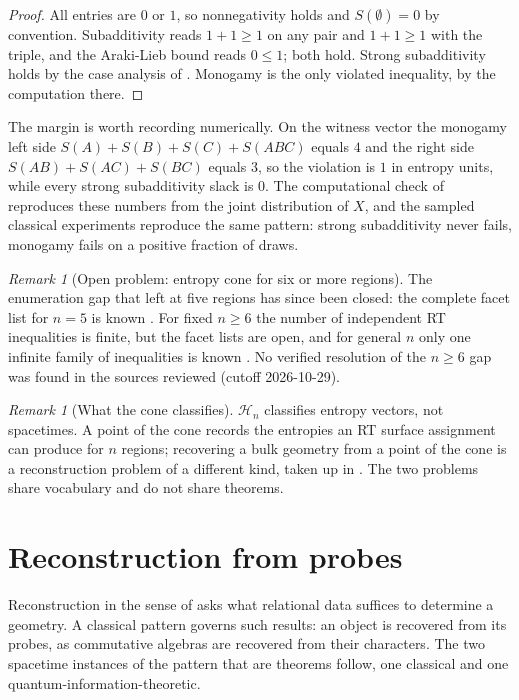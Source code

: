 \documentclass[11pt,letterpaper]{article}
\theoremstyle{definition}
\theoremstyle{remark}
\newtheorem{remark}[theorem]{Remark}
\begin{document}
\begin{proof}
All entries are $0$ or $1$, so nonnegativity holds and $S(\emptyset) = 0$ by convention. Subadditivity reads $1 + 1 \ge 1$ on any pair and $1 + 1 \ge 1$ with the triple, and the Araki-Lieb bound reads $0 \le 1$; both hold. Strong subadditivity holds by the case analysis of . Monogamy is the only violated inequality, by the computation there.
\end{proof}

The margin is worth recording numerically. On the witness vector the monogamy left side $S(A) + S(B) + S(C) + S(ABC)$ equals $4$ and the right side $S(AB) + S(AC) + S(BC)$ equals $3$, so the violation is $1$ in entropy units, while every strong subadditivity slack is $0$. The computational check of  reproduces these numbers from the joint distribution of $X$, and the sampled classical experiments reproduce the same pattern: strong subadditivity never fails, monogamy fails on a positive fraction of draws.

\begin{remark}[Open problem: entropy cone for six or more regions]\label{op:cone5}
The enumeration gap that \cite{baoetal} left at five regions has since been closed: the complete facet list for $n = 5$ is known \cite{hernandezcuenca}. For fixed $n \ge 6$ the number of independent RT inequalities is finite, but the facet lists are open, and for general $n$ only one infinite family of inequalities is known \cite{baoetal}. No verified resolution of the $n \ge 6$ gap was found in the sources reviewed (cutoff 2026-10-29).
\end{remark}

\begin{remark}[What the cone classifies]\label{rem:coneclassifies}
$\mathcal{H}_n$ classifies entropy vectors, not spacetimes. A point of the cone records the entropies an RT surface assignment can produce for $n$ regions; recovering a bulk geometry from a point of the cone is a reconstruction problem of a different kind, taken up in . The two problems share vocabulary and do not share theorems.
\end{remark}

\section{Reconstruction from probes}\label{sec:reconstruction}

Reconstruction in the sense of  asks what relational data suffices to determine a geometry. A classical pattern governs such results: an object is recovered from its probes, as commutative algebras are recovered from their characters. The two spacetime instances of the pattern that are theorems follow, one classical and one quantum-information-theoretic.
\end{document}
